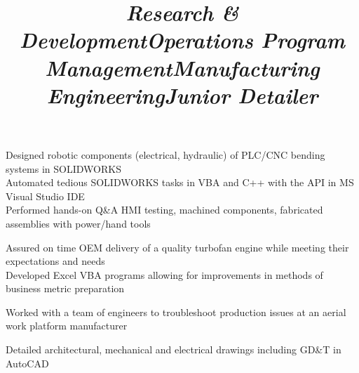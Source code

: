 \documentclass[mm]{res}
\newcommand{\tb}{\textbullet \xspace}
\begin{document}
\begin{resume}
\title{\textsl{Research \& Development}}
\begin{position}
\tb Designed robotic components (electrical, hydraulic) of PLC/CNC bending systems in SOLIDWORKS \\
\tb Automated tedious SOLIDWORKS tasks in VBA and C++ with the API in MS Visual Studio IDE \\
\tb Performed hands-on Q\&A HMI testing, machined components, fabricated assemblies with power/hand tools
\end{position}

\title{\textsl{Operations Program Management}}
\begin{position}
\tb Assured on time OEM delivery of a quality turbofan engine while meeting their expectations and needs \\
\tb Developed Excel VBA programs allowing for improvements in methods of business metric preparation
\end{position}

\title{\textsl{Manufacturing Engineering}}
\begin{position}
\tb Worked with a team of engineers to troubleshoot production issues at an aerial work platform manufacturer
\end{position}

\title{\textsl{Junior Detailer}}
\begin{position}
\tb Detailed architectural, mechanical and electrical drawings including GD\&T in AutoCAD
\end{position}


\end{resume}
\end{document}
